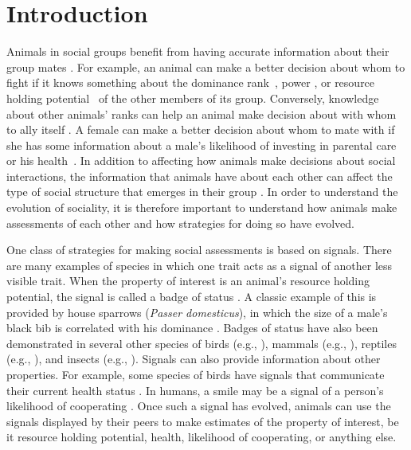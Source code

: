 \section*{Introduction} 
Animals in social groups benefit from having accurate information about their group mates \citep{Seyfarth:2010bh}. For example, an animal can make a better decision about whom to fight if it knows something about the dominance rank~\citep{Waal:1986ys,Cowlishaw:1990vn,Bergman:2003qf,Seyfarth:2005ve,Hobson:2015uq}, power \citep{Flack:2006uq}, or resource holding potential~\citep{Rhijn:1980uq,Freeman:1985kl,Dick:1990cr,Lemel:1993ve,Part:1997ys} of the other members of its group. Conversely, knowledge about other animals' ranks can help an animal make decision about with whom to ally itself \citep{Engh:2005qp}. A female can  make a better decision about whom to mate with if she has some information about a male's likelihood of investing in parental care~\citep{Qvarnstrom:1997fk,McGlothlin:2007au,Olsen:2010uq} or his health~\citep{Folstad:1992kx,Loyau:2005nx}. In addition to affecting how animals make decisions about social interactions, the information that animals have about each other can affect the type of social structure that emerges in their group \citep{Dugatkin:2004hz,Hobson:2015uq,Brush:2018ss}. In order to understand the evolution of sociality, it is therefore important to understand how animals make assessments of each other and how strategies for doing so have evolved.  

One class of strategies for making social assessments is based on signals. There are many examples of species in which one trait acts as a signal of another less visible trait. When the property of interest is an animal's resource holding potential, the signal is called a badge of status \citep{dawkins1978signals,Rohwer:1981vn,Rohwer:1982fk,Ripoll:2004vn,sheehan2016evotradeoff}. A classic example of this is provided by house sparrows (\emph{Passer domesticus}), in which the size of a male's black bib is correlated with his dominance \citep{Veiga:1993fk,Veiga:1995ys}. Badges of status have also been demonstrated in several other species of birds (e.g., \citep{Remy:2010fk,Olsen:2010uq,Lemel:1993ve,Tibbetts:2009kx}), mammals (e.g., \citep{Gerald:2001zm}), reptiles (e.g., \citep{Fox:1990hd}), and insects (e.g., \citep{Tibbetts:2004kx}). Signals can also provide information about other properties. For example, some species of birds have signals that communicate their current health status \citep{Folstad:1992kx,Loyau:2005nx}. In humans, a smile may be a signal of a person's likelihood of cooperating \citep{Schug:2010be}. Once such a signal has evolved, animals can use the signals displayed by their peers to make estimates of the property of interest, be it resource holding potential, health, likelihood of cooperating, or anything else.

